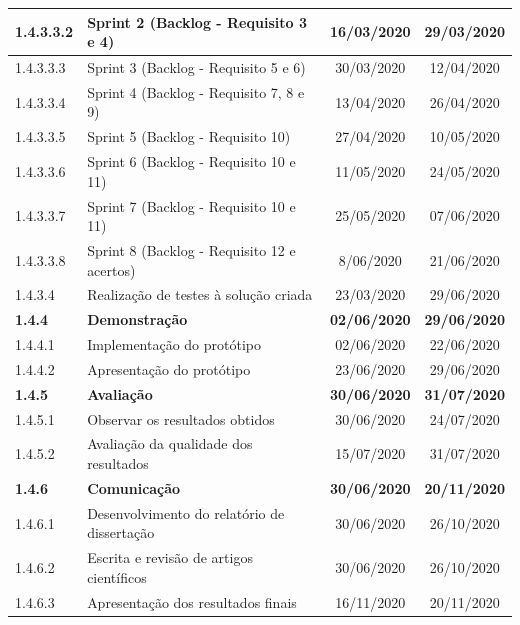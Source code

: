 \begin{table}[H]
\begin{center}
\begin{tabular}{| l | m{8.5cm} | c | c |}
                1.4.3.3.2 & \quad\quad\quad\quad Sprint 2 (Backlog - Requisito 3 e 4) & 16/03/2020 & 29/03/2020 \\ \hline
                1.4.3.3.3 & \quad\quad\quad\quad Sprint 3 (Backlog - Requisito 5 e 6) & 30/03/2020 & 12/04/2020 \\ \hline
                1.4.3.3.4 & \quad\quad\quad\quad Sprint 4 (Backlog - Requisito 7, 8 e 9) & 13/04/2020 & 26/04/2020 \\ \hline
                1.4.3.3.5 & \quad\quad\quad\quad Sprint 5 (Backlog - Requisito 10) & 27/04/2020 & 10/05/2020 \\ \hline
                1.4.3.3.6 & \quad\quad\quad\quad Sprint 6 (Backlog - Requisito 10 e 11) & 11/05/2020 & 24/05/2020 \\ \hline
                1.4.3.3.7 & \quad\quad\quad\quad Sprint 7 (Backlog - Requisito 10 e 11) & 25/05/2020 & 07/06/2020 \\ \hline
                1.4.3.3.8 & \quad\quad\quad\quad Sprint 8 (Backlog - Requisito 12 e acertos) & 8/06/2020 & 21/06/2020 \\ \hline
                1.4.3.4 & \quad\quad\quad Realização de testes à solução criada & 23/03/2020 & 29/06/2020 \\ \hline
                \textbf{1.4.4} & \quad\quad \textbf{Demonstração} & \textbf{02/06/2020} & \textbf{29/06/2020} \\ \hline
                1.4.4.1 & \quad\quad\quad Implementação do protótipo & 02/06/2020  & 22/06/2020 \\ \hline
                1.4.4.2 & \quad\quad\quad Apresentação do protótipo & 23/06/2020 & 29/06/2020 \\ \hline
                \textbf{1.4.5} & \quad\quad \textbf{Avaliação} & \textbf{30/06/2020} & \textbf{31/07/2020} \\ \hline
                1.4.5.1 & \quad\quad\quad Observar os resultados obtidos & 30/06/2020 & 24/07/2020 \\ \hline
                1.4.5.2 & \quad\quad\quad Avaliação da qualidade dos resultados & 15/07/2020 & 31/07/2020 \\ \hline
                \textbf{1.4.6} & \quad\quad \textbf{Comunicação} & \textbf{30/06/2020} & \textbf{20/11/2020} \\ \hline
                1.4.6.1 & \quad\quad\quad Desenvolvimento do relatório de dissertação & 30/06/2020 & 26/10/2020 \\ \hline
                1.4.6.2 & \quad\quad\quad Escrita e revisão de artigos científicos & 30/06/2020 & 26/10/2020 \\ \hline
                1.4.6.3 & \quad\quad\quad Apresentação dos resultados finais & 16/11/2020 & 20/11/2020 \\ \hline
        \end{tabular}
    \end{center}
\end{table}

